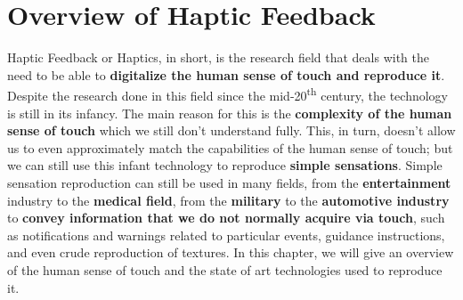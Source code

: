 
\chapter{Overview of Haptic Feedback} %

\label{Chapter3}

Haptic Feedback or Haptics, in short, is the research field that deals with the need to be able to \textbf{digitalize the human sense of touch and reproduce it}. Despite the research done in this field since the mid-20\textsuperscript{th} century, the technology is still in its infancy. The main reason for this is the \textbf{complexity of the human sense of touch} which we still don't understand fully.
This, in turn, doesn't allow us to even approximately match the capabilities of the human sense of touch; but we can still use this infant technology to reproduce \textbf{simple sensations}.
Simple sensation reproduction can still be used in many fields, from the \textbf{entertainment} industry to the \textbf{medical field}, from the \textbf{military} to the \textbf{automotive industry} to \textbf{convey information that we do not normally acquire via touch}, such as notifications and warnings related to particular events, guidance instructions, and even crude reproduction of textures.
In this chapter, we will give an overview of the human sense of touch and the state of art technologies used to reproduce it.





